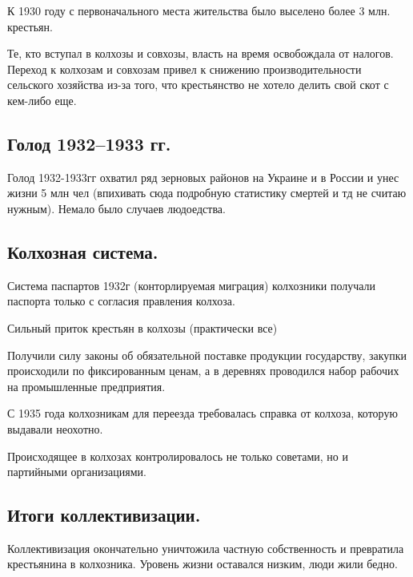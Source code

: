 К 1930 году с первоначального места жительства было выселено более 3 млн. крестьян.

Те, кто вступал в колхозы и совхозы, власть на время освобождала от налогов. Переход к колхозам и совхозам привел к снижению производительности сельского хозяйства из-за того, что крестьянство не хотело делить свой скот с кем-либо еще.

\subsection{Голод 1932--1933 гг.}

Голод 1932-1933гг охватил ряд зерновых районов на Украине и в России и унес жизни 5 млн чел (впихивать сюда подробную статистику смертей и тд не считаю нужным). Немало было случаев людоедства.

\subsection{Колхозная система.}

Система паспартов 1932г (конторлируемая миграция)
колхозники получали паспорта только с согласия правления колхоза.

Сильный приток крестьян в колхозы (практически все)

Получили силу законы об обязательной поставке продукции государству, закупки происходили по фиксированным ценам, а в деревнях проводился набор рабочих на промышленные предприятия. 

С 1935 года колхозникам для переезда требовалась справка от колхоза, которую выдавали неохотно.

Происходящее в колхозах контролировалось не только советами, но и партийными организациями.

\subsection{Итоги коллективизации.}

Коллективизация окончательно уничтожила частную собственность и превратила крестьянина в колхозника. Уровень жизни оставался низким, люди жили бедно. 